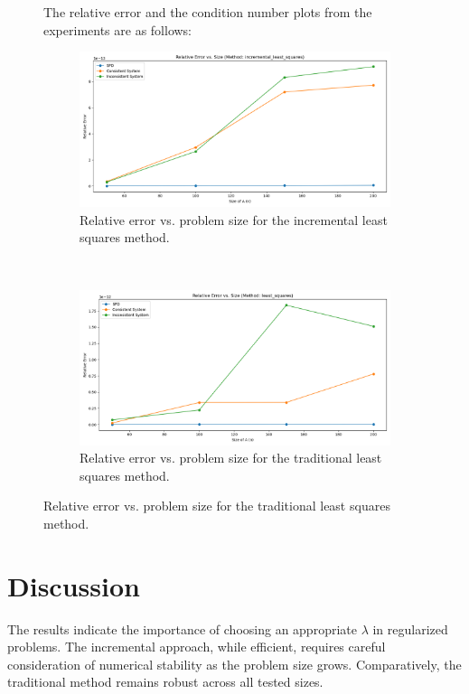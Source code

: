 \documentclass{article}
\begin{document}
\begin{figure}[t!]
    \bigskip %
    The relative error and the condition number plots from the experiments are as follows:
    
    \begin{subfigure}[b]{.45\textwidth}
        \centering
        \includegraphics[width=\linewidth]{errorplot_incremental_least_squares.png}
        \caption{Relative error vs. problem size for the incremental least squares method.}
        \label{fig:error_incremental}
    \end{subfigure}
    ~ %
    \begin{subfigure}[b]{.45\textwidth}
        \centering
        \includegraphics[width=\linewidth]{errorplot_least_squares.png}
        \caption{Relative error vs. problem size for the traditional least squares method.}
        \label{fig:error_least_squares}
    \end{subfigure}
\end{figure}

\section{Discussion}
The results indicate the importance of choosing an appropriate $\lambda$ in regularized problems. The incremental approach, while efficient, requires careful consideration of numerical stability as the problem size grows. Comparatively, the traditional method remains robust across all tested sizes.
\end{document}

